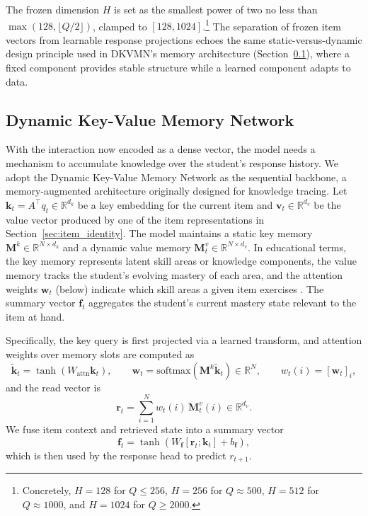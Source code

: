 \documentclass[pdflatex,sn-apa]{sn-jnl}
\begin{document}
The frozen dimension $H$ is set as the smallest power of two no less than $\max(128, \lfloor Q/2 \rfloor)$, clamped to $[128, 1024]$.\footnote{Concretely, $H = 128$ for $Q \le 256$, $H = 256$ for $Q \approx 500$, $H = 512$ for $Q \approx 1000$, and $H = 1024$ for $Q \ge 2000$.} The separation of frozen item vectors from learnable response projections echoes the same static-versus-dynamic design principle used in DKVMN's memory architecture (Section~\ref{sec:dkvmn}), where a fixed component provides stable structure while a learned component adapts to data.

\subsection{Dynamic Key-Value Memory Network}
\label{sec:dkvmn}
With the interaction now encoded as a dense vector, the model needs a mechanism to accumulate knowledge over the student's response history. We adopt the Dynamic Key-Value Memory Network \citep[DKVMN;][]{zhang_dynamic_2017} as the sequential backbone, a memory-augmented architecture originally designed for knowledge tracing.
Let $\mathbf{k}_t = A^{\top} q_t \in \mathbb{R}^{d_k}$ be a key embedding for the current item and
$\mathbf{v}_t \in \mathbb{R}^{d_v}$ be the value vector produced by one of the item representations in Section~\ref{sec:item_identity}.
The model maintains a static key memory $\mathbf{M}^k \in \mathbb{R}^{N \times d_k}$ and
a dynamic value memory $\mathbf{M}^v_t \in \mathbb{R}^{N \times d_v}$.
In educational terms, the key memory represents latent skill areas or knowledge components, the value memory tracks the student's evolving mastery of each area, and the attention weights $\mathbf{w}_t$ (below) indicate which skill areas a given item exercises \citep{zhang_dynamic_2017}. The summary vector $\mathbf{f}_t$ aggregates the student's current mastery state relevant to the item at hand.

Specifically, the key query is first projected via a learned transform, and attention weights over memory slots are computed as
\begin{equation}
    \tilde{\mathbf{k}}_t=\tanh(W_{\mathrm{attn}}\mathbf{k}_t),\qquad
    \mathbf{w}_t=\mathrm{softmax}(\mathbf{M}^k \tilde{\mathbf{k}}_t)\in\mathbb{R}^{N},\qquad
    w_t(i)=[\mathbf{w}_t]_i,
\end{equation}
and the read vector is
\begin{equation}
    \mathbf{r}_t=\sum_{i=1}^{N} w_t(i)\,\mathbf{M}_t^v(i)\in\mathbb{R}^{d_v}.
\end{equation}
We fuse item context and retrieved state into a summary vector
\begin{equation}\label{eqn:summary_vec}
    \mathbf{f}_t=\tanh\!\left(W_{\mathbf{f}}[\mathbf{r}_t;\mathbf{k}_t]+b_{\mathbf{f}}\right),
\end{equation}
which is then used by the response head to predict $r_{t+1}$.
\end{document}
